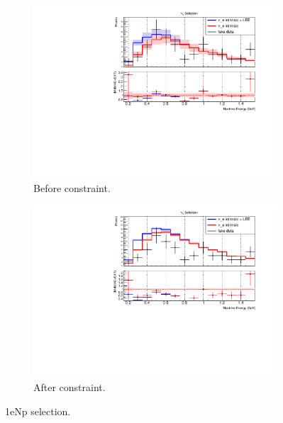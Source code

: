 \begin{figure}[H] 
\begin{center}
    \begin{subfigure}[b]{0.45\textwidth}
    \centering
    \includegraphics[width=1.00\textwidth]{Fakedata/set5/nue_numu_reco_e_H1_mc_fakedata_set5_nue_before_data_constraint.pdf}
    \caption{\label{fig:fakedata:set5:np_before_constrain} Before constraint.}
    \end{subfigure}
    \begin{subfigure}[b]{0.45\textwidth}
    \centering
    \includegraphics[width=1.00\textwidth]{Fakedata/set5/nue_numu_reco_e_H1_mc_fakedata_set5_univ_overlay_nue.pdf}
    \caption{\label{fig:fakedata:set5:np_after_constrain} After constraint.}
    \end{subfigure}
\caption{\label{fig:fakedata:set5:np_const} 1eNp selection.}
\end{center}
\end{figure}

